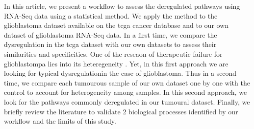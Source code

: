 In this article, we present a workflow to assess the deregulated pathways using RNA-Seq data using a statistical method.
We apply the method to the glioblastoma dataset available on the \acrfull{tcga} cancer database and to our own dataset of glioblastoma RNA-Seq data.
In a first time, we compare the dysregulation in the \acrshort{tcga} dataset with our own datasets to assess their similarities and specificities.
One of the reseaon of therapeutic failure for glioblastompa lies into its heteregeneity \cite*{Neftel2019}.
Yet, in this first approach we are looking for typical dysregulationin the case of glioblastoma.
Thus in a second time, we compare each tumourous sample of our own dataset one by one with the control to account for heterogeneity among samples.
In this second approach, we look for the pathways commonly deregulated in our tumoural dataset.
Finally, we briefly review the literature to validate 2 biological processes identified by our workflow and the limits of this study.
